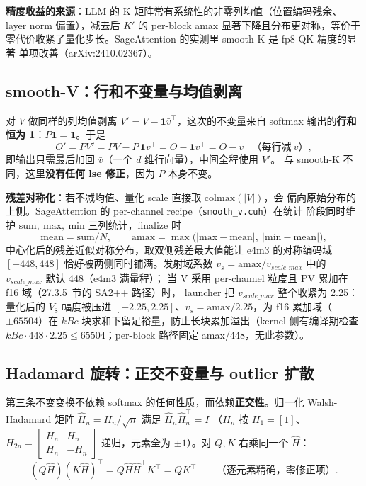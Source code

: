 \textbf{精度收益的来源}：LLM 的 K 矩阵常有系统性的非零列均值（位置编码残余、
layer norm 偏置），减去后 $K'$ 的 per-block amax 显著下降且分布更对称，等价于
零代价收紧了量化步长。SageAttention 的实测里 smooth-K 是 fp8 QK 精度的显著
单项改善（arXiv:2410.02367）。

\subsection{smooth-V：行和不变量与均值剥离}\label{sec:28-smv}

对 $V$ 做同样的列均值剥离 $V' = V - \mathbf{1}\bar v^{\top}$，这次的不变量来自
softmax 输出的\textbf{行和恒为 1}：$P\mathbf{1} = \mathbf{1}$。于是
\begin{equation}
  O' = P V' = P V - P\,\mathbf{1}\bar v^{\top} = O - \mathbf{1}\bar v^{\top}
      = O - \bar v^{\top}\ \text{（每行减}\ \bar v\text{）},
  \label{eq:28-smv-invariant}
\end{equation}
即输出只需最后加回 $\bar v$（一个 $d$ 维行向量），中间全程使用 $V'$。
与 smooth-K 不同，这里\textbf{没有任何 lse 修正}，因为 $P$ 本身不变。

\textbf{残差对称化}：若不减均值、量化 scale 直接取 $\mathrm{colmax}(|V|)$，会
偏向原始分布的上侧。SageAttention 的 per-channel recipe（\texttt{smooth\_v.cuh}）在统计
阶段同时维护 $\mathrm{sum},\ \mathrm{max},\ \mathrm{min}$ 三列统计，finalize 时
\begin{equation}
  \text{mean} = \mathrm{sum}/N,\qquad
  \mathrm{amax} = \max\!\big(|\mathrm{max}-\mathrm{mean}|,\ |\mathrm{min}-\mathrm{mean}|\big),
  \label{eq:28-smv-amax}
\end{equation}
中心化后的残差近似对称分布，取双侧残差最大值能让 e4m3 的对称编码域
$[-448,448]$ 恰好被两侧同时铺满。发射域系数
$v_s = \mathrm{amax}/v_{scale\_max}$ 中的 $v_{scale\_max}$ 默认 448（e4m3 满量程）；
当 V 采用 per-channel 粒度且 PV 累加在 f16 域（27.3.5~节的 SA2++ 路径）时，
launcher 把 $v_{scale\_max}$ 整个收紧为 2.25：量化后的 $V_8$ 幅度被压进
$[-2.25, 2.25]$、$v_s = \mathrm{amax}/2.25$，为 f16 累加域（$\pm 65504$）在
$kBc$ 块求和下留足裕量，防止长块累加溢出（kernel 侧有编译期检查
$kBc\cdot 448\cdot 2.25 \le 65504$；per-block 路径固定 amax/448，无此参数）。

\subsection{Hadamard 旋转：正交不变量与 outlier 扩散}\label{sec:28-wht}

第三条不变变换不依赖 softmax 的任何性质，而依赖\textbf{正交性}。归一化
Walsh-Hadamard 矩阵 $\hat H_n = H_n/\sqrt{n}$ 满足 $\hat H_n \hat H_n^{\top} = I$
（$H_n$ 按 $H_1=[1]$、$H_{2n} = \left[\begin{smallmatrix} H_n & H_n \\ H_n &
-H_n\end{smallmatrix}\right]$ 递归，元素全为 $\pm1$）。对 $Q,K$ 右乘同一个
$\hat H$：
\begin{equation}
  (Q\hat H)(K\hat H)^{\top} = Q \hat H \hat H^{\top} K^{\top} = Q K^{\top}
  \qquad\text{（逐元素精确，零修正项）}.
  \label{eq:28-wht-orth}
\end{equation}

